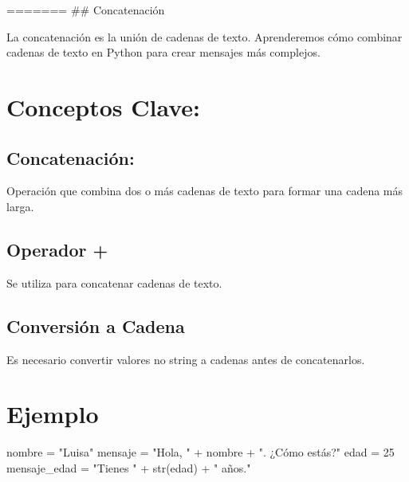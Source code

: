 \documentclass[
  a4paper,
  onepage,
  openany]{scrreprt}
\newenvironment{Shaded}{\begin{snugshade}}{\end{snugshade}}
\newcommand{\BuiltInTok}[1]{\textcolor[rgb]{0.00,0.23,0.31}{#1}}
\newcommand{\DecValTok}[1]{\textcolor[rgb]{0.68,0.00,0.00}{#1}}
\newcommand{\NormalTok}[1]{\textcolor[rgb]{0.00,0.23,0.31}{#1}}
\newcommand{\OperatorTok}[1]{\textcolor[rgb]{0.37,0.37,0.37}{#1}}
\newcommand{\StringTok}[1]{\textcolor[rgb]{0.13,0.47,0.30}{#1}}
\begin{document}
======= \#\# Concatenación

La concatenación es la unión de cadenas de texto. Aprenderemos cómo
combinar cadenas de texto en Python para crear mensajes más complejos.

\hypertarget{conceptos-clave-15}{%
\section{Conceptos Clave:}\label{conceptos-clave-15}}

\hypertarget{concatenaciuxf3n-2}{%
\subsection{Concatenación:}\label{concatenaciuxf3n-2}}

Operación que combina dos o más cadenas de texto para formar una cadena
más larga.

\hypertarget{operador-1}{%
\subsection{Operador +}\label{operador-1}}

Se utiliza para concatenar cadenas de texto.

\hypertarget{conversiuxf3n-a-cadena-1}{%
\subsection{Conversión a Cadena}\label{conversiuxf3n-a-cadena-1}}

Es necesario convertir valores no string a cadenas antes de
concatenarlos.

\hypertarget{ejemplo-15}{%
\section{Ejemplo}\label{ejemplo-15}}

\begin{Shaded}
\begin{Highlighting}[]
\NormalTok{nombre }\OperatorTok{=} \StringTok{"Luisa"}
\NormalTok{mensaje }\OperatorTok{=} \StringTok{"Hola, "} \OperatorTok{+}\NormalTok{ nombre }\OperatorTok{+} \StringTok{". ¿Cómo estás?"}
\NormalTok{edad }\OperatorTok{=} \DecValTok{25}
\NormalTok{mensaje\_edad }\OperatorTok{=} \StringTok{"Tienes "} \OperatorTok{+} \BuiltInTok{str}\NormalTok{(edad) }\OperatorTok{+} \StringTok{" años."}
\end{Highlighting}
\end{Shaded}
\end{document}
